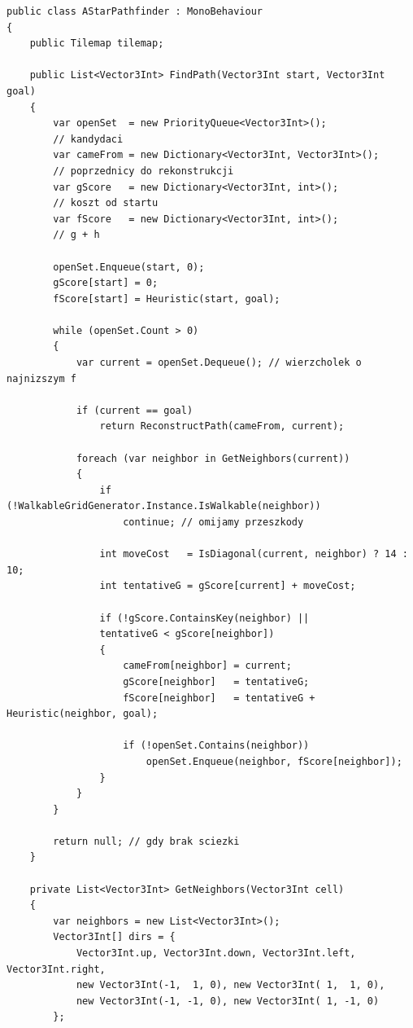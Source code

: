 \documentclass[a4paper,12pt]{book} %
\begin{document}
\begin{lstlisting}[language=CSharp, caption={Algorytm A* z ruchem po przekatnej i kontrola rogow}, label={lst:astar_easy}]
public class AStarPathfinder : MonoBehaviour
{
    public Tilemap tilemap;

    public List<Vector3Int> FindPath(Vector3Int start, Vector3Int goal)
    {
        var openSet  = new PriorityQueue<Vector3Int>();          
        // kandydaci
        var cameFrom = new Dictionary<Vector3Int, Vector3Int>(); 
        // poprzednicy do rekonstrukcji
        var gScore   = new Dictionary<Vector3Int, int>();        
        // koszt od startu
        var fScore   = new Dictionary<Vector3Int, int>();        
        // g + h

        openSet.Enqueue(start, 0);
        gScore[start] = 0;
        fScore[start] = Heuristic(start, goal);

        while (openSet.Count > 0)
        {
            var current = openSet.Dequeue(); // wierzcholek o najnizszym f

            if (current == goal)
                return ReconstructPath(cameFrom, current);

            foreach (var neighbor in GetNeighbors(current))
            {
                if (!WalkableGridGenerator.Instance.IsWalkable(neighbor)) 
                    continue; // omijamy przeszkody

                int moveCost   = IsDiagonal(current, neighbor) ? 14 : 10;
                int tentativeG = gScore[current] + moveCost;

                if (!gScore.ContainsKey(neighbor) || 
                tentativeG < gScore[neighbor])
                {
                    cameFrom[neighbor] = current;
                    gScore[neighbor]   = tentativeG;
                    fScore[neighbor]   = tentativeG + Heuristic(neighbor, goal);

                    if (!openSet.Contains(neighbor))
                        openSet.Enqueue(neighbor, fScore[neighbor]);
                }
            }
        }

        return null; // gdy brak sciezki
    }

    private List<Vector3Int> GetNeighbors(Vector3Int cell)
    {
        var neighbors = new List<Vector3Int>();
        Vector3Int[] dirs = {
            Vector3Int.up, Vector3Int.down, Vector3Int.left, Vector3Int.right,
            new Vector3Int(-1,  1, 0), new Vector3Int( 1,  1, 0),
            new Vector3Int(-1, -1, 0), new Vector3Int( 1, -1, 0)
        };


\end{lstlisting}
\end{document}
